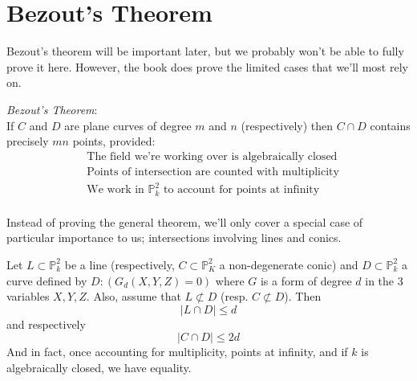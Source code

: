 \section{Bezout's Theorem}
Bezout's theorem will be important later, but we
probably won't be able to fully prove it here. However,
the book does prove the limited cases that we'll most rely on.

\begin{theorem}
\emph{Bezout's Theorem}:\\

If $C$ and $D$ are plane curves of degree $m$ and $n$ (respectively)
then $C \cap D$ contains precisely $mn$ points, provided:
\begin{align*}
&\text{The field we're working over is algebraically closed} \tag{i}\\
&\text{Points of intersection are counted with multiplicity} \tag{ii}\\
&\text{We work in $\mathbb{P}^2_k$ to account for points at infinity} \tag{iii}\\
\end{align*}
\end{theorem}

Instead of proving the general theorem, we'll only cover a special 
case of particular importance to us; intersections involving
lines and conics.

\begin{theorem}
Let $L \subset \mathbb{P}^2_k$ be a line (respectively, $C \subset \mathbb{P}^2_K$ a non-degenerate conic)
and $D \subset \mathbb{P}^2_k$ a curve defined by $D:(G_d(X,Y,Z)=0)$ where $G$ is
a form of degree $d$ in the 3 variables $X,Y,Z$. Also, assume that $L \not\subset D$ (resp. $C \not\subset D$).
Then
\[
|L \cap D| \le d
\]
and respectively
\[
|C \cap D| \le 2d
\]
And in fact, once accounting for multiplicity, points at infinity, and if $k$ is algebraically
closed, we have equality.
\end{theorem}


